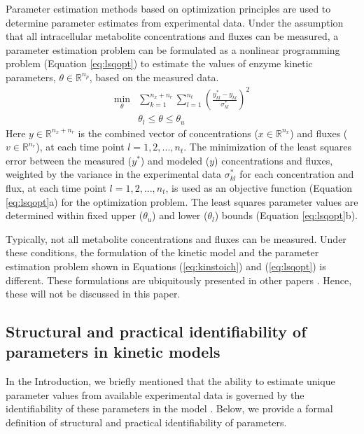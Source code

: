 \documentclass[10pt]{article}
\begin{document}
	Parameter estimation methods based on optimization principles are used to determine parameter estimates from experimental data. Under the assumption that all intracellular metabolite concentrations and fluxes can be measured, a parameter estimation problem can be formulated as a nonlinear programming problem (Equation \ref{eq:lsqopt}) to estimate the values of enzyme kinetic parameters, $\theta \in \mathbb{R}^{n_p}$, based on the measured data. 
	\begin{subequations}\label{eq:lsqopt}
		\begin{align}
		\underset{\theta}{\mathrm{min}} &\sum_{k=1}^{n_x + n_r}\sum_{l=1}^{n_t}\left(\frac{y_{kl}^*-y_{kl}}{\sigma_{kl}^*}\right)^2\\
		&\theta_l \le \theta \le \theta_u
		\end{align}
	\end{subequations}
	Here $y \in \mathbb{R}^{n_x + n_r}$ is the combined vector of concentrations ($x\in \mathbb{R}^{n_x}$) and fluxes ($v \in \mathbb{R}^{n_r}$), at each time point $l={1, 2, ..., n_t}$. The minimization of the least squares error between the measured ($y^*$) and modeled ($y$) concentrations and fluxes, weighted by the variance in the experimental data $\sigma_{kl}^*$ for each concentration and flux, at each time point $l={1, 2, ..., n_t}$, is used as an objective function (Equation \ref{eq:lsqopt}a) for the optimization problem. The least squares parameter values are determined within fixed upper ($\theta_u$) and lower ($\theta_l$) bounds (Equation \ref{eq:lsqopt}b). 
	
	Typically, not all metabolite concentrations and fluxes can be measured. Under these conditions, the formulation of the kinetic model and the parameter estimation problem shown in Equations (\ref{eq:kinstoich}) and (\ref{eq:lsqopt}) is different. These formulations are ubiquitously presented in other papers \parencite{Gadkar2005a,Rodriguez-Fernandez2006}. Hence, these will not be discussed in this paper. 
	
	\subsection{Structural and practical identifiability of parameters in kinetic models}\label{sec:ident_def}
	In the Introduction, we briefly mentioned that the ability to estimate unique parameter values from available experimental data is governed by the identifiability of these parameters in the model \parencite{Ljung1994,Vanlier2012,Berthoumieux2013,Raue2014}. Below, we provide a formal definition of structural and practical identifiability of parameters.
	
\end{document}
